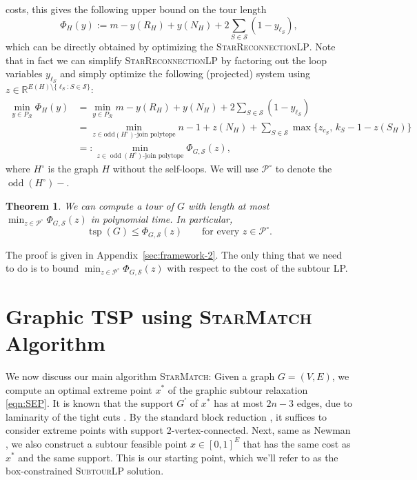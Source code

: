 \documentclass[11pt]{amsart}
\DeclareMathOperator{\odd}{odd}
\newcommand{\1}{\mathbbm{1}}
\newcommand{\ALG}{\textsc{StarMatch}}
\newcommand{\SubtourLP}{\textsc{SubtourLP}}
\newcommand{\LPtwo}{\textsc{StarReconnectionLP}}
\newtheorem{theorem}{Theorem}[section]
\begin{document}
costs, this gives the following upper bound on the tour length 
\[
\Phi_H(y):= m-y(R_H)+y(N_H)+2\sum_{S\in\mathcal S}(1-y_{\ell_S}), 
\]
which can be directly obtained by optimizing the \LPtwo. {Note that in fact we can simplify \LPtwo{} by factoring out the loop variables $y_{\ell_S}$ and simply optimize the following (projected) system using $z \in \mathbb{R}^{E(H)\setminus \{\ell_S:S\in \mathcal S\}}$:
\begin{align}
\min_{y \in P_\mathcal R} \Phi_{H}(y) &= \min_{y \in P_\mathcal R} m-y(R_H)+y(N_H)+2\sum_{S\in\mathcal S}(1-y_{\ell_S}) \\
&= \min_{z\in \text{odd}(H^\circ)\text{-join polytope}} n-1+z(N_H)+
 \sum_{S\in\mathcal S}\max\{z_{c_S},\,k_S-1-z(S_H)\}\label{proc:join-cost}\\
 &=: \min_{z\in \odd (H^\circ)\text{-join polytope}} \Phi_{G, {\mathcal S}}(z),   
\end{align}}
where $H^\circ$ is the graph $H$ without the self-loops. {We will use $\mathcal P^\circ$ to denote the $\odd (H^\circ)-$.}


 

\begin{theorem}\label{proc:repair-bound}
{We can compute a tour of $G$
with length at most
$\min_{z\in\mathcal P^\circ}\Phi_{G,\mathcal S}(z)$ in polynomial time.
In particular,
\[
 \operatorname{tsp}(G)\le\Phi_{G,\mathcal S}(z)
 \qquad\text{for every }z\in\mathcal P^\circ.
\]}
\end{theorem}

{The proof is given in
Appendix~\ref{sec:framework-2}.}
{The only thing that we need to do is to bound {$\min_{z\in\mathcal P^\circ}\Phi_{G,\mathcal S}(z)$} with respect to the cost of the subtour LP.} 

\section{Graphic TSP using \ALG{} Algorithm} \label{proc:StarMatch}
{We now discuss our main algorithm \ALG{}: Given a graph $G=(V,E)$, we compute an optimal extreme
point $x^*$ of the graphic subtour relaxation
\eqref{eqn:SEP}. It is known that the support $G^\prime$ of $x^*$ has at most $2n-3$ edges, due to laminarity of the tight cuts \cite{CornuejolsFonluptNaddef}. By the standard block reduction
\cite[Proposition~12.1]{TraubVygen}, it suffices to consider extreme points with support $2$-vertex-connected. Next, same as Newman \cite{Newman}, we also construct a subtour feasible point $x \in [0,1]^{E}$ that has the same cost as $x^*$ and the same support. This is our starting point, which we'll refer to as the box-constrained \SubtourLP{} solution.}
\end{document}
